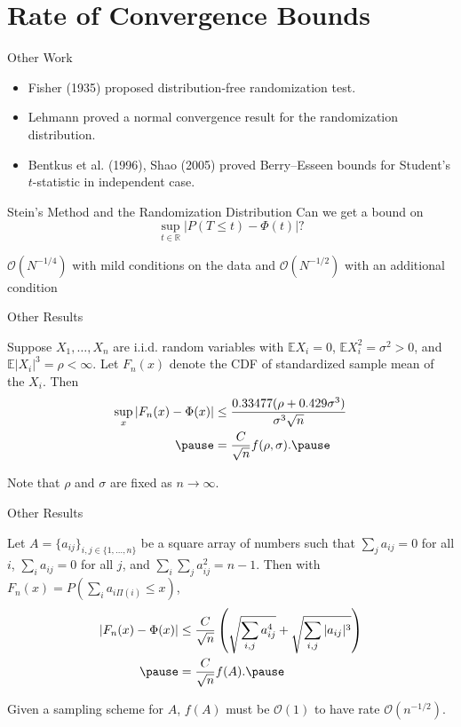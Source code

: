 \documentclass{beamer}
\newcommand{\E}{\mathbb{E}}
\begin{document}
\section{Rate of Convergence Bounds}

\begin{frame}{Other Work}
  \begin{itemize}
  \item Fisher (1935) proposed distribution-free
    randomization test.  \pause
  \item Lehmann proved a normal convergence
    result for the randomization distribution. \pause
  \item Bentkus et al. (1996), Shao (2005) proved Berry--Esseen bounds for
    Student's $t$-statistic in independent case.
  \end{itemize}
\end{frame}

\begin{frame}{Stein's Method and the Randomization Distribution}
  Can we get a bound on
  \begin{equation*}
    \sup_{t \in \mathbb{R}} |P(T \leq t) - \Phi(t)|?
  \end{equation*}
  \pause

  $\mathcal{O}(N^{-1/4})$ with mild conditions on the data
  and $\mathcal{O}(N^{-1/2})$ with an additional condition
\end{frame}

\begin{frame}{Other Results}
  \begin{theorem}
  Suppose $X_1, \ldots, X_n$ are i.i.d. random variables with
  $\E X_i = 0$, $\E X_i^2 = \sigma^2 > 0$, and $\E |X_i|^3 = \rho
  < \infty$.  Let $F_n(x)$ denote the CDF of standardized sample mean
  of the $X_i$.  Then
  \begin{align*}
    \sup_x |F_n(x) - \Phi(x)| &\leq \frac{0.33477(\rho + 0.429\sigma^3)}{\sigma^3 \sqrt{n}} \\ \pause
    &= \frac{C}{\sqrt{n}} f(\rho, \sigma). \pause
  \end{align*}
  \end{theorem}
  Note that $\rho$ and $\sigma$ are fixed as $n \to \infty$.
\end{frame}

\begin{frame}{Other Results}
  \begin{theorem}
    Let $A = \{a_{ij}\}_{i, j \in \{1, \ldots, n\}}$ be a square array of
      numbers such that $\sum_j a_{ij} = 0$ for all $i$, $\sum_i
      a_{ij} = 0$ for all $j$, and $\sum_i \sum_j a_{ij}^2 = n - 1$.
      Then with $F_n(x) = P(\sum_i a_{i\Pi(i)} \leq x)$,
  \begin{align*}
    |F_n(x) - \Phi(x)| &\leq \frac{C}{\sqrt{n}}
    \left (
      \sqrt{\sum_{i,j}a_{ij}^4} + \sqrt{\sum_{i,j}|a_{ij}|^3}
    \right ) \\ \pause
    &= \frac{C}{\sqrt{n}} f(A). \pause
  \end{align*}
  \end{theorem}
  Given a sampling scheme for $A$, $f(A)$ must be $\mathcal{O}(1)$ to have rate $\mathcal{O}(n^{-1/2})$.
\end{frame}
\end{document}
